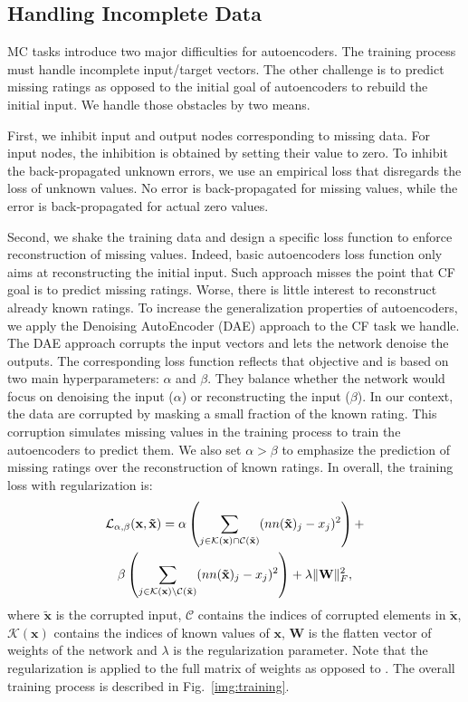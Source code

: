\documentclass{article}
\newcommand{\mtx}[1]{\ensuremath{\mathbf{#1}}}
\begin{document}
\subsection{Handling Incomplete Data}

MC tasks introduce two major difficulties for autoencoders. The training process must handle incomplete input/target vectors. The other challenge is to predict missing ratings as opposed to the initial goal of autoencoders to rebuild the initial input. We handle those obstacles by two means. 

First, we inhibit input and output nodes corresponding to missing data. For input nodes, the inhibition is obtained by setting their value to zero. To inhibit the back-propagated unknown errors, we use an empirical loss that disregards the loss of unknown values. No error is back-propagated for missing values, while the error is back-propagated for actual zero values.

Second, we shake the training data and design a specific loss function to enforce reconstruction of missing values. Indeed, basic autoencoders loss function only aims at reconstructing the initial input. Such approach misses the point that CF goal is to predict missing ratings. Worse, there is little interest to reconstruct already known ratings. To increase the generalization properties of autoencoders, we apply the Denoising AutoEncoder (DAE) approach \cite{Vincent2008} to the CF task we handle.
The DAE approach corrupts the input vectors and lets the network denoise the outputs. The corresponding loss function reflects that objective and is based on two main hyperparameters: $\alpha$ and $\beta$. They balance whether the network would focus on denoising the input ($\alpha$) or reconstructing the input ($\beta$). In our context, the data are corrupted by masking a small fraction of the known rating.
This corruption simulates missing values in the training process to train the autoencoders to predict them.
We also set $\alpha > \beta$ to emphasize the prediction of missing ratings over the reconstruction of known ratings. 
In overall, the training loss with regularization is:
\begin{multline}\label{eq:loss}
{\cal L}_{\alpha, \beta}(\mtx{x},\mtx{\tilde{x}}) = 
\alpha\left(\sum_{j\in \mathcal{K}(\mtx{x}) \cap \mathcal{C}(\tilde{\mtx{x}})}(nn(\mtx{\tilde{x}})_j - x_j)^2\right)
 + \\
\beta \left(\sum_{j\in \mathcal{K}(\mtx{x}) \setminus \mathcal{C}(\tilde{\mtx{x}})}(nn(\mtx{\tilde{x}})_j - x_j)^2\right) + \lambda\|\mtx{W}\|_{F}^2,
\end{multline}
where \mtx{\tilde{x}} is the corrupted input, $\mathcal{C}$ contains the indices of corrupted elements in $\mtx{\tilde{x}}$, $\mathcal{K}(\mtx{x})$ contains the indices of known values of $\mtx{x}$, $\mtx{W}$ is the flatten vector of weights of the network and $\lambda$ is the regularization parameter. Note that the regularization is applied to the full matrix of weights as opposed to \cite{Sedhain2015}. The overall training process is described in Fig.~\ref{img:training}.
\end{document}
